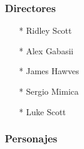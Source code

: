 \documentclass[ä5paper, 11pt]{article}
\begin{document}
          \subsubsection*{Directores}   
             \begin{enumerate}
                \item[*]{Ridley Scott}
                \item[*]{Alex Gabasii}
                \item[*]{James Hawves}
                \item[*]{Sergio Mimica}
                \item[*]{Luke Scott}
            \end{enumerate}
        \subsubsection*{Personajes}
\end{document}

